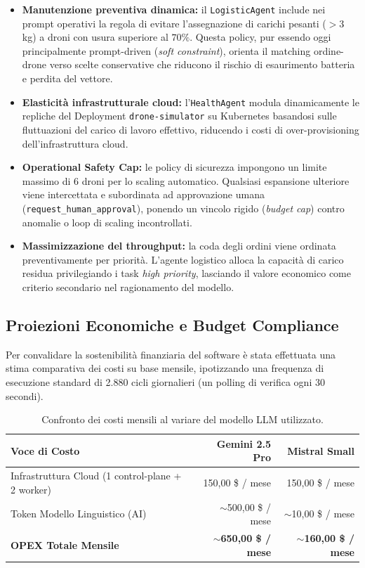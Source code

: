 \begin{itemize}
    \item \textbf{Manutenzione preventiva dinamica:} il \texttt{LogisticAgent} include nei prompt operativi la regola di evitare l'assegnazione di carichi pesanti ($>3$\,kg) a droni con usura superiore al $70\%$. Questa policy, pur essendo oggi principalmente prompt-driven (\textit{soft constraint}), orienta il matching ordine-drone verso scelte conservative che riducono il rischio di esaurimento batteria e perdita del vettore.
    \item \textbf{Elasticità infrastrutturale cloud:} l'\texttt{HealthAgent} modula dinamicamente le repliche del Deployment \texttt{drone-simulator} su Kubernetes basandosi sulle fluttuazioni del carico di lavoro effettivo, riducendo i costi di over-provisioning dell'infrastruttura cloud.
    \item \textbf{Operational Safety Cap:} le policy di sicurezza impongono un limite massimo di 6 droni per lo scaling automatico. Qualsiasi espansione ulteriore viene intercettata e subordinata ad approvazione umana (\texttt{request\_human\_approval}), ponendo un vincolo rigido (\textit{budget cap}) contro anomalie o loop di scaling incontrollati.
    \item \textbf{Massimizzazione del throughput:} la coda degli ordini viene ordinata preventivamente per priorità. L'agente logistico alloca la capacità di carico residua privilegiando i task \textit{high priority}, lasciando il valore economico come criterio secondario nel ragionamento del modello.
\end{itemize}

\label{sec:opex_budget}

\subsection*{Proiezioni Economiche e Budget Compliance}
Per convalidare la sostenibilità finanziaria del software è stata effettuata una stima comparativa dei costi su base mensile, ipotizzando una frequenza di esecuzione standard di 2.880 cicli giornalieri (un polling di verifica ogni 30 secondi).

\begin{table}[ht]
\centering
\begin{tabular}{lrr}
\toprule
\textbf{Voce di Costo} & \textbf{Gemini 2.5 Pro} & \textbf{Mistral Small} \\
\midrule
Infrastruttura Cloud (1 control-plane + 2 worker) & 150{,}00 \$ / mese & 150{,}00 \$ / mese \\
Token Modello Linguistico (AI) & $\sim$500{,}00 \$ / mese & $\sim$10{,}00 \$ / mese \\
\midrule
\textbf{OPEX Totale Mensile} & \textbf{$\sim$650{,}00 \$ / mese} & \textbf{$\sim$160{,}00 \$ / mese} \\
\bottomrule
\end{tabular}
\caption{Confronto dei costi mensili al variare del modello LLM utilizzato.}
\label{tab:costi_opex}
\end{table}


